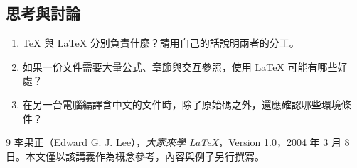 \subsection*{思考與討論}

\begin{enumerate}
    \item TeX 與 LaTeX 分別負責什麼？請用自己的話說明兩者的分工。
    \item 如果一份文件需要大量公式、章節與交互參照，使用 LaTeX 可能有哪些好處？
    \item 在另一台電腦編譯含中文的文件時，除了原始碼之外，還應確認哪些環境條件？
\end{enumerate}

\clearpage
{}
\begin{thebibliography}{9}
李果正（Edward G. J. Lee），\textit{大家來學 \LaTeX{}}，Version 1.0，2004 年 3 月 8 日。本文僅以該講義作為概念參考，內容與例子另行撰寫。
\end{thebibliography}